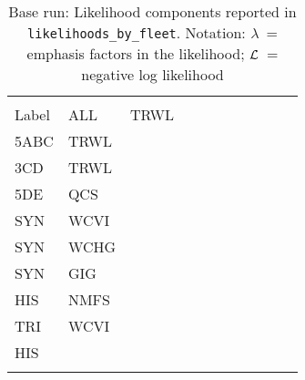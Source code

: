 \begin{longtable}[c]{>{\raggedleft\let\newline\\\arraybackslash\hspace{0pt}}p{1.0in}>{\raggedleft\let\newline\\\arraybackslash\hspace{0pt}}p{0.55in}>{\raggedleft\let\newline\\\arraybackslash\hspace{0pt}}p{0.55in}>{\raggedleft\let\newline\\\arraybackslash\hspace{0pt}}p{0.55in}>{\raggedleft\let\newline\\\arraybackslash\hspace{0pt}}p{0.55in}>{\raggedleft\let\newline\\\arraybackslash\hspace{0pt}}p{0.55in}>{\raggedleft\let\newline\\\arraybackslash\hspace{0pt}}p{0.55in}>{\raggedleft\let\newline\\\arraybackslash\hspace{0pt}}p{0.55in}>{\raggedleft\let\newline\\\arraybackslash\hspace{0pt}}p{0.55in}>{\raggedleft\let\newline\\\arraybackslash\hspace{0pt}}p{0.55in}>{\raggedleft\let\newline\\\arraybackslash\hspace{0pt}}p{0.55in}}
  \caption{Base run: Likelihood components reported in \texttt{likelihoods\_by\_fleet}. Notation: $\lambda$~= emphasis factors in the likelihood; $\mathcal{L}$~= negative log likelihood} \label{tab:pop.like3}\\  \hline\\[-2.2ex]
  Label  & ALL & TRWL\newline 5ABC & TRWL\newline 3CD & TRWL\newline 5DE & QCS\newline SYN & WCVI\newline SYN & WCHG\newline SYN & GIG\newline HIS & NMFS\newline TRI & WCVI\newline HIS \\[0.2ex]\hline\\[-1.5ex]  \endfirsthead   \hline  

\end{longtable}
